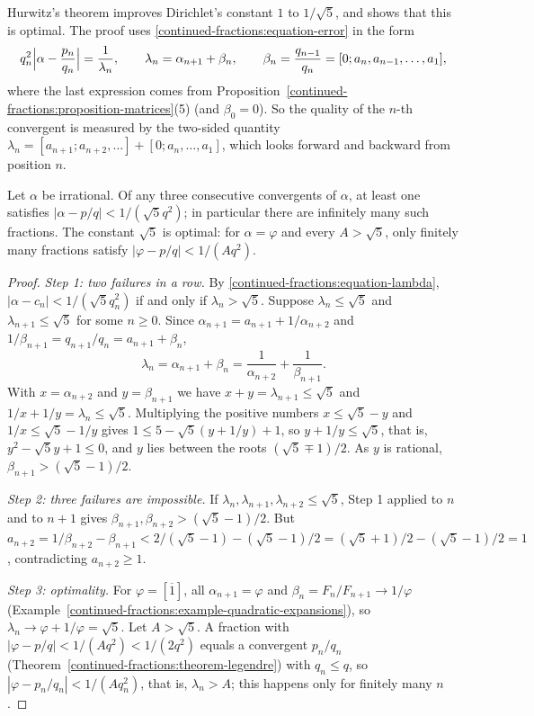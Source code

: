 Hurwitz's theorem improves Dirichlet's constant $1$ to $1/\sqrt5$, and shows that this is optimal. The proof uses \eqref{continued-fractions:equation-error} in the form
\begin{equation}\label{continued-fractions:equation-lambda}
q_n^2\Bigl|\alpha - \frac{p_n}{q_n}\Bigr| = \frac{1}{\lambda_n}, \qquad \lambda_n = \alpha_{n+1} + \beta_n, \qquad \beta_n = \frac{q_{n-1}}{q_n} = [0; a_n, a_{n-1}, \ldots, a_1],
\end{equation}
where the last expression comes from Proposition~\ref{continued-fractions:proposition-matrices}(5) (and $\beta_0 = 0$). So the quality of the $n$-th convergent is measured by the two-sided
quantity $\lambda_n = [a_{n+1}; a_{n+2}, \ldots] + [0; a_n, \ldots, a_1]$, which looks forward and backward from position $n$.

\begin{theorem}[Hurwitz]\label{continued-fractions:theorem-hurwitz}
Let $\alpha$ be irrational. Of any three consecutive convergents of $\alpha$, at least one satisfies $|\alpha - p/q| < 1/(\sqrt5q^2)$; in particular there are infinitely many such fractions. The
constant $\sqrt5$ is optimal: for $\alpha = \varphi$ and every $A > \sqrt5$, only finitely many fractions satisfy $|\varphi - p/q| < 1/(Aq^2)$.
\end{theorem}

\begin{proof}
\emph{Step 1: two failures in a row.} By \eqref{continued-fractions:equation-lambda}, $|\alpha - c_n| < 1/(\sqrt5q_n^2)$ if and only if $\lambda_n > \sqrt5$. Suppose $\lambda_n \leq \sqrt5$ and
$\lambda_{n+1} \leq \sqrt5$ for some $n \geq 0$. Since $\alpha_{n+1} = a_{n+1} + 1/\alpha_{n+2}$ and $1/\beta_{n+1} = q_{n+1}/q_n = a_{n+1} + \beta_n$,
\[
\lambda_n = \alpha_{n+1} + \beta_n = \frac{1}{\alpha_{n+2}} + \frac{1}{\beta_{n+1}}.
\]
With $x = \alpha_{n+2}$ and $y = \beta_{n+1}$ we have $x + y = \lambda_{n+1} \leq \sqrt5$ and $1/x + 1/y = \lambda_n \leq \sqrt5$. Multiplying the positive numbers $x \leq \sqrt5 - y$ and
$1/x \leq \sqrt5 - 1/y$ gives $1 \leq 5 - \sqrt5(y + 1/y) + 1$, so $y + 1/y \leq \sqrt5$, that is, $y^2 - \sqrt5y + 1 \leq 0$, and $y$ lies between the roots $(\sqrt5 \mp 1)/2$. As $y$ is rational,
$\beta_{n+1} > (\sqrt5 - 1)/2$.

\emph{Step 2: three failures are impossible.} If $\lambda_n, \lambda_{n+1}, \lambda_{n+2} \leq \sqrt5$, Step 1 applied to $n$ and to $n + 1$ gives $\beta_{n+1}, \beta_{n+2} > (\sqrt5 - 1)/2$. But
$a_{n+2} = 1/\beta_{n+2} - \beta_{n+1} < 2/(\sqrt5 - 1) - (\sqrt5 - 1)/2 = (\sqrt5 + 1)/2 - (\sqrt5 - 1)/2 = 1$, contradicting $a_{n+2} \geq 1$.

\emph{Step 3: optimality.} For $\varphi = [\overline{1}]$, all $\alpha_{n+1} = \varphi$ and $\beta_n = F_n/F_{n+1} \to 1/\varphi$ (Example~\ref{continued-fractions:example-quadratic-expansions}), so
$\lambda_n \to \varphi + 1/\varphi = \sqrt5$. Let $A > \sqrt5$. A fraction with $|\varphi - p/q| < 1/(Aq^2) < 1/(2q^2)$ equals a convergent $p_n/q_n$ (Theorem~\ref{continued-fractions:theorem-legendre})
with $q_n \leq q$, so $|\varphi - p_n/q_n| < 1/(Aq_n^2)$, that is, $\lambda_n > A$; this happens only for finitely many $n$.
\end{proof}


